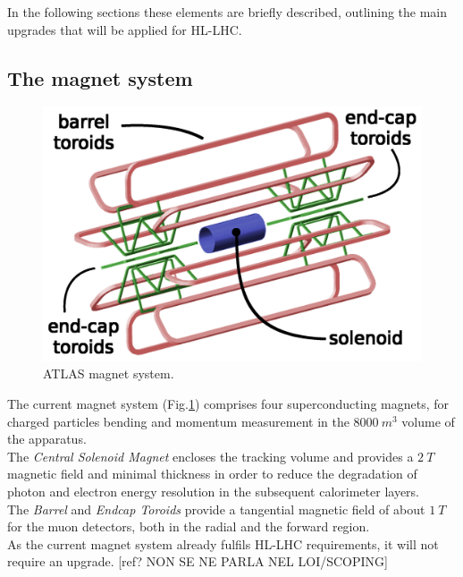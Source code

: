 \documentclass[a4paper,twoside,12pt]{article}
\begin{document}
In the following sections these elements are briefly described, outlining the main upgrades that will be applied for HL-LHC. 

\subsection{The magnet system}\label{sec:magnet}

\begin{figure} [h]
	\centering
	\includegraphics[scale=0.13]{magnetSystems}
	\caption{ATLAS magnet system\cite{magnet_system_picture}.}
	\label{fig:magnet_system_picture}
\end{figure}

The current magnet system (Fig.\ref{fig:magnet_system_picture}) comprises four superconducting magnets\cite{magnet_system}, for charged particles bending and momentum measurement in the $8000\ m^3$ volume of the apparatus.\\

The \textit{Central Solenoid Magnet} encloses the tracking volume and provides a $2\ T$ magnetic field and minimal thickness in order to reduce the degradation of photon and electron energy resolution in the subsequent calorimeter layers.\\

The \textit{Barrel} and \textit{Endcap Toroids} provide a tangential magnetic field of about $1\ T$ for the muon detectors, both in the radial and the forward region.\\

As the current magnet system already fulfils HL-LHC requirements, it will not require an
upgrade. [ref? NON SE NE PARLA NEL LOI/SCOPING]
\end{document}
